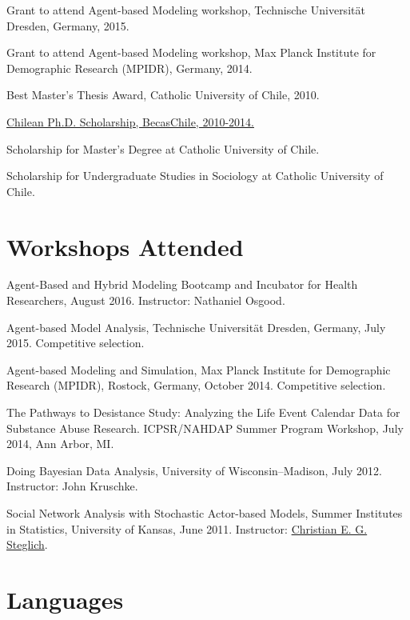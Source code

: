 \documentclass[10pt,letterpaper]{article}
\renewenvironment{itemize}{
  \begin{list}{}{
    \setlength{\leftmargin}{1.5em}
    \setlength{\itemsep}{0.25em}
    \setlength{\parskip}{0pt}
    \setlength{\parsep}{0.25em}
  }
}{
  \end{list}
}
\begin{document}
\begin{itemize}
\item Grant to attend Agent-based Modeling workshop, Technische Universität Dresden, Germany, 2015.
\item Grant to attend Agent-based Modeling workshop, Max Planck Institute for Demographic Research (MPIDR), Germany, 2014.
\item Best Master's Thesis Award, Catholic University of Chile, 2010.
\item \href{http://www.becaschile.cl}{Chilean Ph.D. Scholarship, BecasChile, 2010-2014.}
\item Scholarship for Master’s Degree at Catholic University of Chile.
\item Scholarship for Undergraduate Studies in Sociology at Catholic University of Chile.
\end{itemize}

\section*{Workshops Attended}

\begin{itemize}


\item Agent-Based and Hybrid Modeling Bootcamp and Incubator for Health Researchers, August 2016. Instructor: Nathaniel Osgood.
\item Agent-based Model Analysis, Technische Universität Dresden, Germany, July 2015. Competitive selection.
\item Agent-based Modeling and Simulation, Max Planck Institute for Demographic Research (MPIDR), Rostock, Germany, October 2014. Competitive selection.
\item The Pathways to Desistance Study: Analyzing the Life Event Calendar Data for Substance Abuse Research. ICPSR/NAHDAP Summer Program Workshop, July 2014, Ann Arbor, MI.
\item Doing Bayesian Data Analysis, University of Wisconsin--Madison, July 2012. Instructor: John Kruschke.
\item Social Network Analysis with Stochastic Actor-based Models, Summer Institutes in Statistics,  University of Kansas, June 2011. Instructor: \href{http://www.ppsw.rug.nl/~steglich/sites/index.htm}{Christian E. G. Steglich}.

 \end{itemize}

\section*{Languages}
\end{document}
